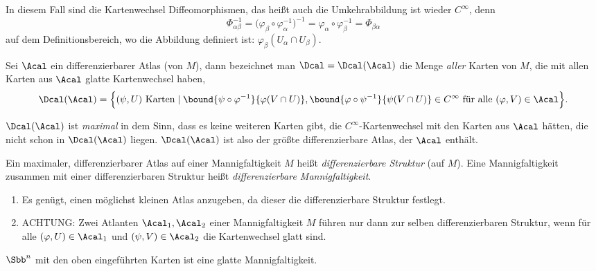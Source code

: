 \begin{rem*}
	In diesem Fall sind die Kartenwechsel Diffeomorphismen, das heißt auch die Umkehrabbildung ist wieder $C^\infty$, denn
	\[ \Phi_{\alpha\beta}^{-1} = \big(\varphi_\beta \circ \varphi_\alpha^{-1}\big)^{-1} = \varphi_\alpha \circ \varphi_\beta^{-1} = \Phi_{\beta\alpha} \]
	auf dem Definitionsbereich, wo die Abbildung definiert ist: $ \varphi_\beta(U_\alpha \cap U_\beta). $
\end{rem*}

\begin{defn}
	Sei $\Acal$ ein differenzierbarer Atlas (von $M$), dann bezeichnet man $\Dcal = \Dcal(\Acal)$ die Menge \emph{aller} Karten von $M$, die mit allen Karten aus $\Acal$ glatte Kartenwechsel haben,
	\[ \Dcal(\Acal) = \Big\{ (\psi,U) \ \text{Karten} \mid \bound{\psi \circ \varphi^{-1}}{\varphi(V \cap U)}, \bound{\varphi \circ \psi^{-1}}{\psi(V \cap U)} \in C^\infty \ \text{für alle } (\varphi,V) \in \Acal \Big\}. \]
	\begin{rem*}
		$\Dcal(\Acal)$ ist \emph{maximal} in dem Sinn, dass es keine weiteren Karten gibt, die $C^\infty$-Kartenwechsel mit den Karten aus $\Acal$ hätten, die nicht schon in $\Dcal(\Acal)$ liegen. $\Dcal(\Acal)$ ist also der größte differenzierbare Atlas, der $\Acal$ enthält.
	\end{rem*}
	\begin{notat*}
		Ein maximaler, differenzierbarer Atlas auf einer Mannigfaltigkeit $M$ heißt \emph{differenzierbare Struktur} (auf $M$). Eine Mannigfaltigkeit zusammen mit einer differenzierbaren Struktur heißt \emph{differenzierbare Mannigfaltigkeit}.
	\end{notat*}
\end{defn}

\begin{rem*}
	\begin{enumerate}[label = {\roman*})]
		\item Es genügt, einen möglichst kleinen Atlas anzugeben, da dieser die differenzierbare Struktur festlegt.
		\item ACHTUNG: Zwei Atlanten $ \Acal_1,\Acal_2 $ einer Mannigfaltigkeit $M$ führen nur dann zur selben differenzierbaren Struktur, wenn für alle $ (\varphi,U) \in \Acal_1 $ und $ (\psi,V) \in \Acal_2 $ die Kartenwechsel glatt sind.
	\end{enumerate}
\end{rem*}

\begin{exmp*}
	$ \Sbb^n $ mit den oben eingeführten Karten ist eine glatte Mannigfaltigkeit.
\end{exmp*}
	
